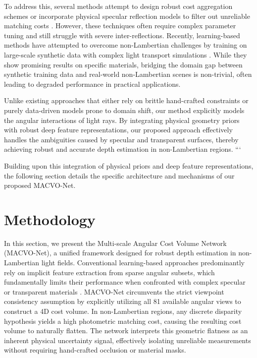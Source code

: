\documentclass[lettersize,journal]{IEEEtran}
\begin{document}
To address this, several methods attempt to design robust cost aggregation schemes or incorporate physical specular reflection models to filter out unreliable matching costs . However, these techniques often require complex parameter tuning and still struggle with severe inter-reflections. Recently, learning-based methods have attempted to overcome non-Lambertian challenges by training on large-scale synthetic data with complex light transport simulations . While they show promising results on specific materials, bridging the domain gap between synthetic training data and real-world non-Lambertian scenes is non-trivial, often leading to degraded performance in practical applications.

Unlike existing approaches that either rely on brittle hand-crafted constraints or purely data-driven models prone to domain shift, our method explicitly models the angular interactions of light rays. By integrating physical geometry priors with robust deep feature representations, our proposed approach effectively handles the ambiguities caused by specular and transparent surfaces, thereby achieving robust and accurate depth estimation in non-Lambertian regions.
```

Building upon this integration of physical priors and deep feature representations, the following section details the specific architecture and mechanisms of our proposed MACVO-Net.

\section{Methodology}

In this section, we present the Multi-scale Angular Cost Volume Network (MACVO-Net), a unified framework designed for robust depth estimation in non-Lambertian light fields. Conventional learning-based approaches predominantly rely on implicit feature extraction from sparse angular subsets, which fundamentally limits their performance when confronted with complex specular or transparent materials \cite{heber2018, wang2023}. MACVO-Net circumvents the strict viewpoint consistency assumption by explicitly utilizing all 81 available angular views to construct a 4D cost volume. In non-Lambertian regions, any discrete disparity hypothesis yields a high photometric matching cost, causing the resulting cost volume to naturally flatten. The network interprets this geometric flatness as an inherent physical uncertainty signal, effectively isolating unreliable measurements without requiring hand-crafted occlusion or material masks.
\end{document}
